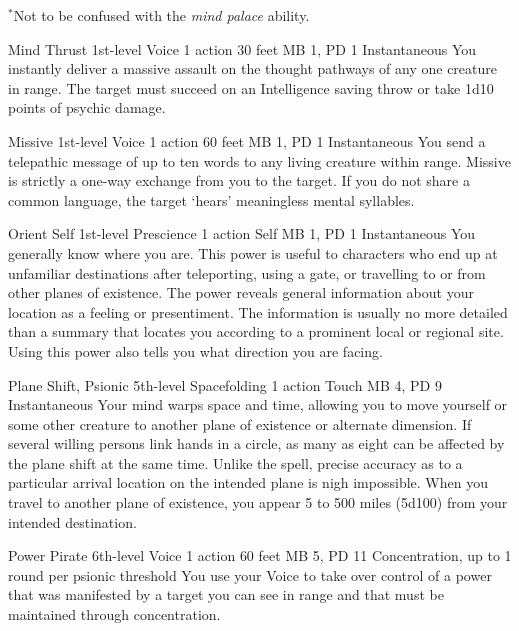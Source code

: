   $^*$Not to be confused with the \emph{mind palace} ability.

\DndPowerHeader%
  {Mind Thrust}
  {1st-level Voice}
  {1 action}
  {30 feet}
  {MB 1, PD 1}
  {Instantaneous}
You instantly deliver a massive assault on the thought pathways
of any one creature in range.
The target must succeed on an Intelligence saving throw
or take 1d10 points of psychic damage.

\DndPowerHeader%
  {Missive}
  {1st-level Voice}
  {1 action}
  {60 feet}
  {MB 1, PD 1}
  {Instantaneous}
  You send a telepathic message of up to ten words to
  any living creature within range.
  Missive is strictly a one-way exchange from you to the target.
  If you do not share a common language,
  the target `hears' meaningless mental syllables.

\DndPowerHeader%
  {Orient Self}
  {1st-level Prescience}
  {1 action}
  {Self}
  {MB 1, PD 1}
  {Instantaneous}
You generally know where you are.
This power is useful to characters who end up at unfamiliar destinations
after teleporting,
using a gate,
or travelling to or from other planes of existence.
The power reveals general information about your location
as a feeling or presentiment.
The information is usually no more detailed than a summary
that locates you according to a prominent local or regional site.
Using this power also tells you what direction you are facing.

\DndPowerHeader%
  {Plane Shift, Psionic}
  {5th-level Spacefolding}
  {1 action}
  {Touch}
  {MB 4, PD 9}
  {Instantaneous}
  Your mind warps space and time,
  allowing you to move yourself
  or some other creature to another plane of existence
  or alternate dimension.
  If several willing persons link hands in a circle,
  as many as eight can be affected by the plane shift at the same time.
  Unlike the  spell,
  precise accuracy as to a particular arrival location
  on the intended plane is nigh impossible.
  When you travel to another plane of existence,
  you appear 5 to 500 miles (5d100) from your intended destination.

\DndPowerHeader%
  {Power Pirate}
  {6th-level Voice}
  {1 action}
  {60 feet}
  {MB 5, PD 11}
  {Concentration, up to 1 round per psionic threshold}
  You use your Voice to take over control of a power
  that was manifested by a target you can see in range
  and that must be maintained through concentration.

